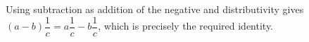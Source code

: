 Using subtraction as addition of the negative and distributivity gives $(a-b)\dfrac{1}{c}=a\dfrac{1}{c}-b\dfrac{1}{c}$, which is precisely the required identity.
